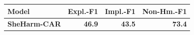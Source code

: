 \begin{tabular}{lrrr}
\toprule
\textbf{Model} & \textbf{Expl.-F1} & \textbf{Impl.-F1} & \textbf{Non-Hm.-F1} \\
\midrule
\textbf{SheHarm-CAR} & \textbf{46.9} & \textbf{43.5} & \textbf{73.4} \\
\bottomrule
\end{tabular}
